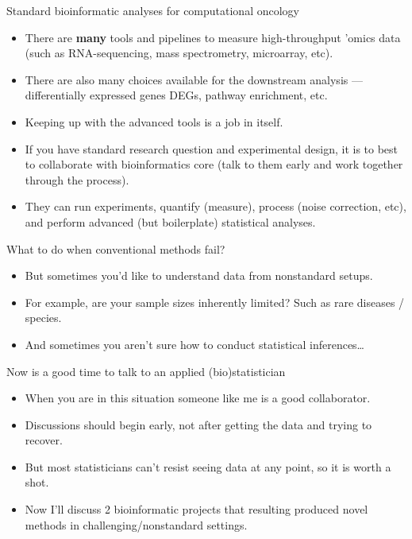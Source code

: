 \documentclass[ignorenonframetext,aspectratio=169,]{beamer}
\begin{document}
\begin{frame}{%
\protect\hypertarget{standard-bioinformatic-analyses-for-computational-oncology}{%
Standard bioinformatic analyses for computational oncology}}

\begin{itemize}
\item
  There are \textbf{many} tools and pipelines to measure high-throughput
  ’omics data (such as RNA-sequencing, mass spectrometry, microarray,
  etc).
\item
  There are also many choices available for the downstream analysis —
  differentially expressed genes DEGs, pathway enrichment, etc.
\item
  Keeping up with the advanced tools is a job in itself.
\item
  If you have standard research question and experimental design, it is
  to best to collaborate with bioinformatics core (talk to them early
  and work together through the process).
\item
  They can run experiments, quantify (measure), process (noise
  correction, etc), and perform advanced (but boilerplate) statistical
  analyses.
\end{itemize}

\end{frame}

\begin{frame}{%
\protect\hypertarget{what-to-do-when-conventional-methods-fail}{%
What to do when conventional methods fail?}}

\begin{itemize}
\item
  But sometimes you’d like to understand data from nonstandard setups.
\item
  For example, are your sample sizes inherently limited? Such as rare
  diseases / species.
\item
  And sometimes you aren’t sure how to conduct statistical
  inferences\ldots{}
\end{itemize}

\end{frame}

\begin{frame}{%
\protect\hypertarget{now-is-a-good-time-to-talk-to-an-applied-biostatistician}{%
Now is a good time to talk to an applied (bio)statistician}}

\begin{itemize}
\item
  When you are in this situation someone like me is a good collaborator.
\item
  Discussions should begin early, not after getting the data and trying
  to recover.
\item
  But most statisticians can’t resist seeing data at any point, so it is
  worth a shot.
\item
  Now I’ll discuss 2 bioinformatic projects that resulting produced
  novel methods in challenging/nonstandard settings.
\end{itemize}

\end{frame}
\end{document}
